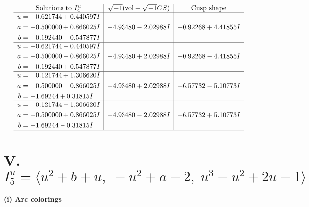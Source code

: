 \documentclass[1p]{elsarticle_modified}
\theoremstyle{definition}
\newcommand{\I}{\sqrt{-1}}
\begin{document}
$$\begin{array}{c|c|c}  
\text{Solutions to }I^u_{4}& \I (\text{vol} + \sqrt{-1}CS) & \text{Cusp shape}\\
 \hline 
\begin{aligned}
u &= -0.621744 + 0.440597 I \\
a &= -0.500000 + 0.866025 I \\
b &= \phantom{-}0.192440 - 0.547877 I\end{aligned}
 & -4.93480 - 2.02988 I & -0.92268 + 4.41855 I \\ \hline\begin{aligned}
u &= -0.621744 - 0.440597 I \\
a &= -0.500000 - 0.866025 I \\
b &= \phantom{-}0.192440 + 0.547877 I\end{aligned}
 & -4.93480 + 2.02988 I & -0.92268 - 4.41855 I \\ \hline\begin{aligned}
u &= \phantom{-}0.121744 + 1.306620 I \\
a &= -0.500000 - 0.866025 I \\
b &= -1.69244 + 0.31815 I\end{aligned}
 & -4.93480 + 2.02988 I & -6.57732 - 5.10773 I \\ \hline\begin{aligned}
u &= \phantom{-}0.121744 - 1.306620 I \\
a &= -0.500000 + 0.866025 I \\
b &= -1.69244 - 0.31815 I\end{aligned}
 & -4.93480 - 2.02988 I & -6.57732 + 5.10773 I\\
 \hline 
 \end{array}$$\newpage\newpage\renewcommand{\arraystretch}{1}
\centering \section*{V. $I^u_{5}= \langle u^2+b+u,\;- u^2+a-2,\;u^3- u^2+2 u-1 \rangle$}
\flushleft \textbf{(i) Arc colorings}\\
\end{document}
